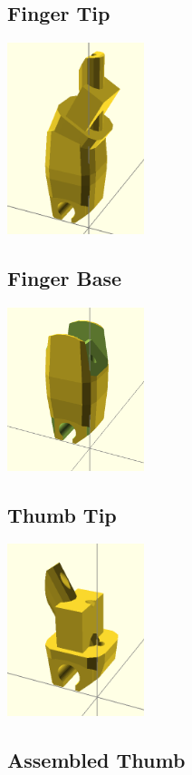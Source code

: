 \documentclass[11pt]{article}
\begin{document}
\hypertarget{thing_finger\_tip}{\subsection{Finger Tip}}
\includegraphics[width=4cm]{images/finger_tip.png}

\hypertarget{thing_finger\_base}{\subsection{Finger Base}}
\includegraphics[width=4cm]{images/finger_base.png}

\hypertarget{thing_thumb\_tip}{\subsection{Thumb Tip}}
\includegraphics[width=4cm]{images/thumb_tip.png}

\hypertarget{thing_thumb\_assembly}{\subsection{Assembled Thumb}}
\end{document}
